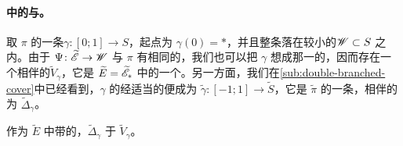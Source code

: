 \paragraph{\trDoubleCover{}中的\trVanishingCycle{}与\trMatchingCycle{}。}\label{sub:vanishing-matching-double-cover}
取 $\pi$ 的一条\trVanishingPath{}$\gamma\colon[0;1]\to S$，起点为 $\gamma(0)=*$，并且整条落在较小的\trDisk{}$\mathscr{W}\subset S$ 之内。由于 $\Psi\colon\widetilde{\mathscr{E}}\to\mathscr{W}$ 与 $\pi$ 有相同的\trCriticalValue，我们也可以把 $\gamma$ 想成那一\trLefschetzFibration{}的\trVanishingPath，因而存在一个相伴的\trVanishingCycle{}$\widetilde{V}_\gamma$，它是 $\widetilde{E}=\widetilde{\mathscr{E}}_*$ 中的一个\trLagrange\trSphere。另一方面，我们在\cref{sub:double-branched-cover}中已经看到，$\gamma$ 的\trPreimage{}经适当的\trParametrization{}便成为 $\tilde{\gamma}\colon[-1;1]\to\widetilde{S}$，它是 $\tilde{\pi}$ 的一条\trMatchingPath，相伴的\trMatchingCycle{}为 $\widetilde{\Delta}_\gamma$。
\begin{lemma}\label{thm:matching-vanishing-isotopy}
作为 $\widetilde{E}$ 中带\trFrame{}的\trLagrange\trSphere，$\widetilde{\Delta}_\gamma$ \trIsotopy{}于 $\widetilde{V}_\gamma$。
\end{lemma}
